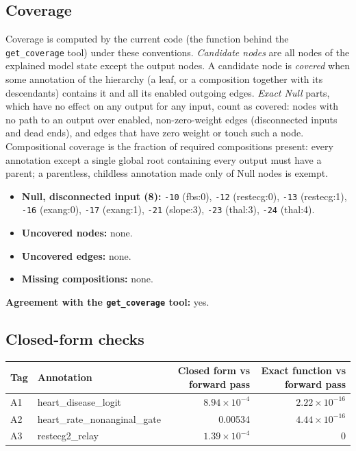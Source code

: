 \begin{drafted}
\subsection{Coverage}\label{app:heart-s2-c2:coverage}
Coverage is computed by the current code (the function behind the \texttt{get\_coverage} tool) under these conventions. \emph{Candidate nodes} are all nodes of the explained model state except the output nodes. A candidate node is \emph{covered} when some annotation of the hierarchy (a leaf, or a composition together with its descendants) contains it and all its enabled outgoing edges. \emph{Exact Null} parts, which have no effect on any output for any input, count as covered: nodes with no path to an output over enabled, non-zero-weight edges (disconnected inputs and dead ends), and edges that have zero weight or touch such a node. Compositional coverage is the fraction of required compositions present: every annotation except a single global root containing every output must have a parent; a parentless, childless annotation made only of Null nodes is exempt.

\begin{itemize}
\item \textbf{Null, disconnected input (8):} \texttt{-10} (fbs:0), \texttt{-12} (restecg:0), \texttt{-13} (restecg:1), \texttt{-16} (exang:0), \texttt{-17} (exang:1), \texttt{-21} (slope:3), \texttt{-23} (thal:3), \texttt{-24} (thal:4).
\item \textbf{Uncovered nodes:} none.
\item \textbf{Uncovered edges:} none.
\item \textbf{Missing compositions:} none.
\end{itemize}
\noindent\textbf{Agreement with the \texttt{get\_coverage} tool:} yes.

\subsection{Closed-form checks}\label{app:heart-s2-c2:closedform}
{\small\noindent\begin{tabularx}{\linewidth}{@{}lXrr@{}}
\toprule Tag & Annotation & Closed form vs forward pass & Exact function vs forward pass \\ \midrule
A1 & heart\_\allowbreak{}disease\_\allowbreak{}logit & $8.94\times 10^{-4}$ & $2.22\times 10^{-16}$ \\
A2 & heart\_\allowbreak{}rate\_\allowbreak{}nonanginal\_\allowbreak{}gate & 0.00534 & $4.44\times 10^{-16}$ \\
A3 & restecg2\_\allowbreak{}relay & $1.39\times 10^{-4}$ & 0 \\
\bottomrule
\end{tabularx}\par}

\end{drafted}
